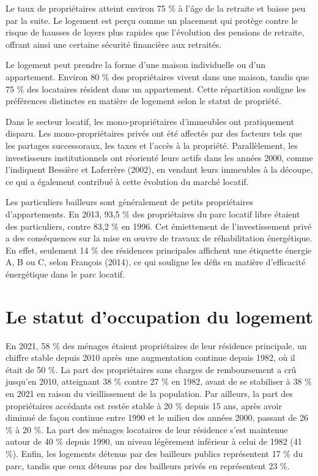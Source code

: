\documentclass[a4paper, 12pt]{report}
\begin{document}
Le taux de propriétaires atteint environ 75 \% à l’âge de la retraite et baisse peu par la suite. Le logement est perçu comme un placement qui protège contre le risque de hausses de loyers plus rapides que l’évolution des pensions de retraite, offrant ainsi une certaine sécurité financière aux retraités.

Le logement peut prendre la forme d'une maison individuelle ou d'un appartement. Environ 80 \% des propriétaires vivent dans une maison, tandis que 75 \% des locataires résident dans un appartement. Cette répartition souligne les préférences distinctes en matière de logement selon le statut de propriété.

Dans le secteur locatif, les mono-propriétaires d’immeubles ont pratiquement disparu. Les mono-propriétaires privés ont été affectés par des facteurs tels que les partages successoraux, les taxes et l'accès à la propriété. Parallèlement, les investisseurs institutionnels ont réorienté leurs actifs dans les années 2000, comme l'indiquent Bessière et Laferrère (2002), en vendant leurs immeubles à la découpe, ce qui a également contribué à cette évolution du marché locatif.

Les particuliers bailleurs sont généralement de petits propriétaires d’appartements. En 2013, 93,5 \% des propriétaires du parc locatif libre étaient des particuliers, contre 83,2 \% en 1996. Cet émiettement de l’investissement privé a des conséquences sur la mise en œuvre de travaux de réhabilitation énergétique. En effet, seulement 14 \% des résidences principales affichent une étiquette énergie A, B ou C, selon François (2014), ce qui souligne les défis en matière d'efficacité énergétique dans le parc locatif.

\section{Le statut d'occupation du logement}

En 2021, 58 \% des ménages étaient propriétaires de leur résidence principale, un chiffre stable depuis 2010 après une augmentation continue depuis 1982, où il était de 50 \%. La part des propriétaires sans charges de remboursement a crû jusqu’en 2010, atteignant 38 \% contre 27 \% en 1982, avant de se stabiliser à 38 \% en 2021 en raison du vieillissement de la population. Par ailleurs, la part des propriétaires accédants est restée stable à 20 \% depuis 15 ans, après avoir diminué de façon continue entre 1990 et le milieu des années 2000, passant de 26 \% à 20 \%. La part des ménages locataires de leur résidence s'est maintenue autour de 40 \% depuis 1990, un niveau légèrement inférieur à celui de 1982 (41 \%). Enfin, les logements détenus par des bailleurs publics représentent 17 \% du parc, tandis que ceux détenus par des bailleurs privés en représentent 23 \%.
\end{document}
